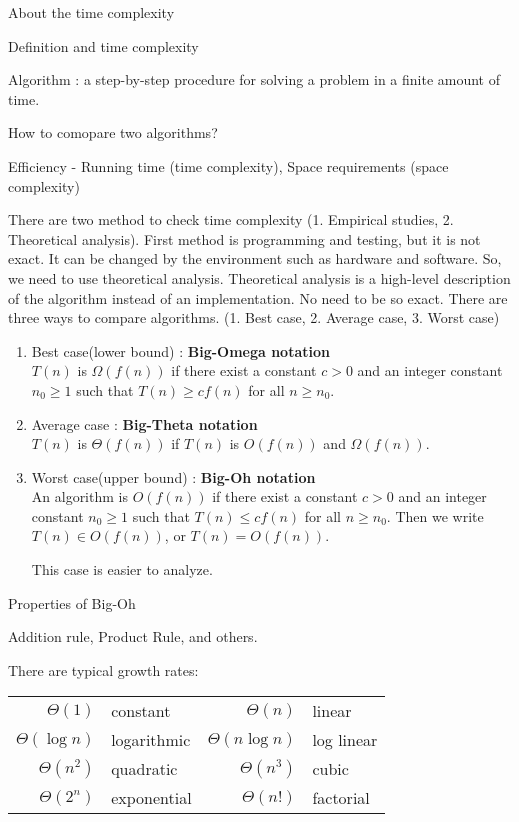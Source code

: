 \begin{section}
    {About the time complexity}


\begin{subsection}
    {Definition and time complexity}
\end{subsection}
\noindent
Algorithm : a step-by-step procedure for solving a problem in a finite amount of time.

\bigskip\noindent
How to comopare two algorithms?

\noindent
Efficiency - Running time (time complexity), Space requirements (space complexity)

\bigskip
There are two method to check time complexity (1. Empirical studies, 2. Theoretical analysis). First method is programming and testing, but it is not exact. It can be changed by the environment such as hardware and software. So, we need to use theoretical analysis. Theoretical analysis is a high-level description of the algorithm instead of an implementation. No need to be so exact. There are three ways to compare algorithms. (1. Best case, 2. Average case, 3. Worst case)
\bigskip
\begin{enumerate}
    \item Best case(lower bound) : 
    \textbf{Big-Omega notation} \\
    $T(n)$ is $\Omega(f(n))$ if there exist a constant $c>0$ and an integer constant $n_0 \ge 1$ such that $T(n) \ge c f(n)$ for all $n \ge n_0$.
    \item Average case :
    \textbf{Big-Theta notation} \\
    $T(n)$ is $\Theta(f(n))$ if $T(n)$ is $O(f(n))$ and $\Omega(f(n))$.
    \item Worst case(upper bound) :
    \textbf{Big-Oh notation} \\
    An algorithm is $O(f(n))$ if there exist a constant $c>0$ and an integer constant $n_0 \ge 1$ such that $T(n) \le cf(n)$ for all $n \ge n_0$. Then we write $T(n) \in O(f(n))$, or $T(n) = O(f(n))$.

    This case is easier to analyze.
\end{enumerate}

\noindent
\begin{subsection}
    {Properties of Big-Oh}
\end{subsection}
Addition rule, Product Rule, and others.

There are typical growth rates:
\begin{center}
    \begin{tabular}{|rl|rl|}
        \hline
        $\Theta(1)$ & constant & $\Theta(n)$ & linear \\
        $\Theta(\log n)$ & logarithmic & $\Theta(n \log n)$ & log linear \\
        $\Theta(n^2)$ & quadratic & $\Theta(n^3)$ & cubic \\
        $\Theta(2^n)$ & exponential & $\Theta(n!)$ & factorial \\
        \hline
    \end{tabular}
\end{center}


\end{section}
